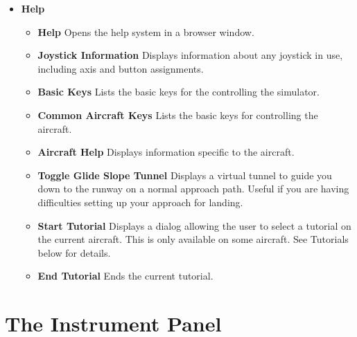 \begin{itemize}
 \item \textbf{Help}
 \begin{itemize}
 \item \textbf{Help} Opens the help system in a browser window.
 \item \textbf{Joystick Information} Displays information about any joystick
 in use, including axis and button assignments.
 \item \textbf{Basic Keys} Lists the basic keys for the controlling the
simulator.
 \item \textbf{Common Aircraft Keys} Lists the basic keys for controlling the
aircraft.
 \item \textbf{Aircraft Help} Displays information specific to the aircraft.
 \item \textbf{Toggle Glide Slope Tunnel} Displays a virtual tunnel to guide
 you down to the runway on a normal approach path. Useful if you are having
 difficulties setting up your approach for landing.
 \item \textbf{Start Tutorial} Displays a dialog allowing the user to select a
tutorial on the current aircraft.
 This is only available on some aircraft. See Tutorials below for details.
 \item \textbf{End Tutorial}  Ends the current tutorial.
 \end{itemize}
\end{itemize}

\section{The Instrument Panel}

 \centerline{}

